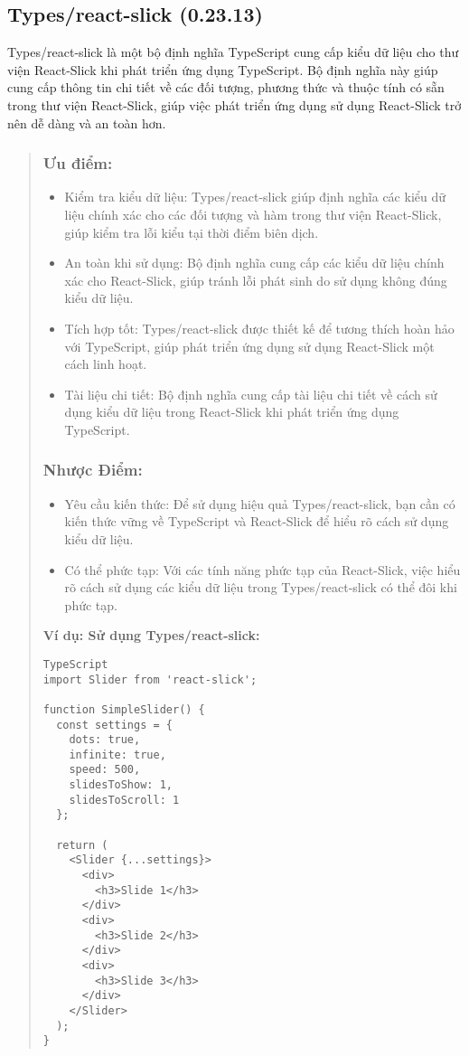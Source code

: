 \subsection{Types/react-slick (0.23.13)}

Types/react-slick là một bộ định nghĩa TypeScript cung cấp kiểu dữ liệu cho thư viện React-Slick khi phát triển ứng dụng TypeScript. Bộ định nghĩa này giúp cung cấp thông tin chi tiết về các đối tượng, phương thức và thuộc tính có sẵn trong thư viện React-Slick, giúp việc phát triển ứng dụng sử dụng React-Slick trở nên dễ dàng và an toàn hơn.

\begin{quote}
\subsubsection{Ưu điểm:}
\begin{itemize}
  \item Kiểm tra kiểu dữ liệu: Types/react-slick giúp định nghĩa các kiểu dữ liệu chính xác cho các đối tượng và hàm trong thư viện React-Slick, giúp kiểm tra lỗi kiểu tại thời điểm biên dịch.
  \item An toàn khi sử dụng: Bộ định nghĩa cung cấp các kiểu dữ liệu chính xác cho React-Slick, giúp tránh lỗi phát sinh do sử dụng không đúng kiểu dữ liệu.
  \item Tích hợp tốt: Types/react-slick được thiết kế để tương thích hoàn hảo với TypeScript, giúp phát triển ứng dụng sử dụng React-Slick một cách linh hoạt.
  \item Tài liệu chi tiết: Bộ định nghĩa cung cấp tài liệu chi tiết về cách sử dụng kiểu dữ liệu trong React-Slick khi phát triển ứng dụng TypeScript.
\end{itemize}

\subsubsection{Nhược Điểm:}
\begin{itemize}
  \item Yêu cầu kiến thức: Để sử dụng hiệu quả Types/react-slick, bạn cần có kiến thức vững về TypeScript và React-Slick để hiểu rõ cách sử dụng kiểu dữ liệu.
  \item Có thể phức tạp: Với các tính năng phức tạp của React-Slick, việc hiểu rõ cách sử dụng các kiểu dữ liệu trong Types/react-slick có thể đôi khi phức tạp.
\end{itemize}

\textbf{Ví dụ: Sử dụng Types/react-slick:}
\begin{lstlisting}
TypeScript
import Slider from 'react-slick';

function SimpleSlider() {
  const settings = {
    dots: true,
    infinite: true,
    speed: 500,
    slidesToShow: 1,
    slidesToScroll: 1
  };

  return (
    <Slider {...settings}>
      <div>
        <h3>Slide 1</h3>
      </div>
      <div>
        <h3>Slide 2</h3>
      </div>
      <div>
        <h3>Slide 3</h3>
      </div>
    </Slider>
  );
}
\end{lstlisting}
\end{quote}



